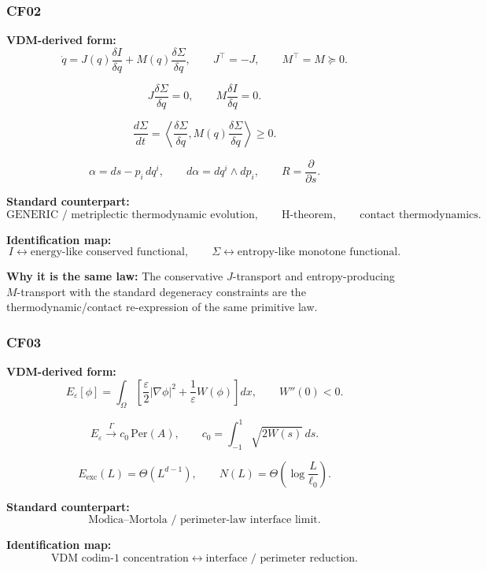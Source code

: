 \documentclass[11pt]{article}
\theoremstyle{definition}
\theoremstyle{plain}
\theoremstyle{remark}
\begin{document}

\subsubsection*{CF02}
\textbf{VDM-derived form:}
\[
\dot q
=
J(q)\frac{\delta I}{\delta q}
+
M(q)\frac{\delta \Sigma}{\delta q},
\qquad
J^\top=-J,
\qquad
M^\top=M\succeq 0.
\]

\[
J\frac{\delta \Sigma}{\delta q}=0,
\qquad
M\frac{\delta I}{\delta q}=0.
\]

\[
\frac{d\Sigma}{dt}
=
\left\langle
\frac{\delta\Sigma}{\delta q},
M(q)\frac{\delta\Sigma}{\delta q}
\right\rangle
\ge 0.
\]

\[
\alpha = ds - p_i\,dq^i,
\qquad
d\alpha = dq^i\wedge dp_i,
\qquad
R=\frac{\partial}{\partial s}.
\]

\textbf{Standard counterpart:}
\[
\text{GENERIC / metriplectic thermodynamic evolution},
\qquad
\text{H-theorem},
\qquad
\text{contact thermodynamics}.
\]

\textbf{Identification map:}
\[
I \leftrightarrow \text{energy-like conserved functional},
\qquad
\Sigma \leftrightarrow \text{entropy-like monotone functional}.
\]

\textbf{Why it is the same law:} The conservative \(J\)-transport and
entropy-producing \(M\)-transport with the standard degeneracy constraints are
the thermodynamic/contact re-expression of the same primitive law.


\subsubsection*{CF03}
\textbf{VDM-derived form:}
\[
E_\varepsilon[\phi]
=
\int_\Omega
\left[
\frac{\varepsilon}{2}|\nabla\phi|^2
+
\frac{1}{\varepsilon}W(\phi)
\right]dx,
\qquad
W''(0)<0.
\]

\[
E_\varepsilon \xrightarrow{\Gamma} c_0\,\mathrm{Per}(A),
\qquad
c_0=\int_{-1}^{1}\sqrt{2W(s)}\,ds.
\]

\[
E_{\mathrm{exc}}(L)=\Theta(L^{d-1}),
\qquad
N(L)=\Theta\!\left(\log\frac{L}{\ell_0}\right).
\]

\textbf{Standard counterpart:}
\[
\text{Modica--Mortola / perimeter-law interface limit}.
\]

\textbf{Identification map:}
\[
\text{VDM codim-1 concentration}
\leftrightarrow
\text{interface / perimeter reduction}.
\]
\end{document}
